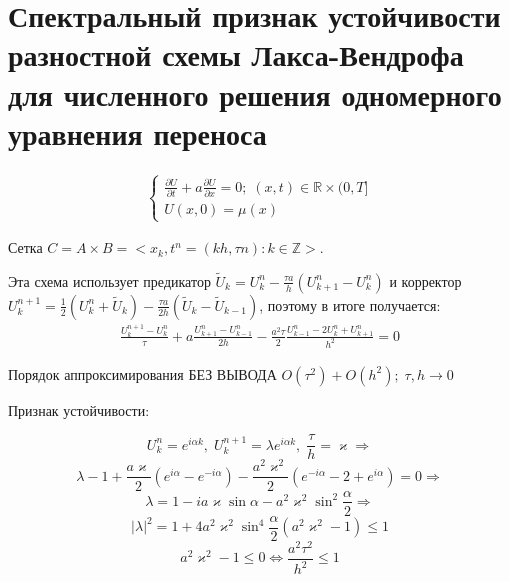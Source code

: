\documentclass[__main__.tex]{subfiles}
\begin{document}
\section{Спектральный признак устойчивости разностной схемы Лакса-Вендрофа для численного решения одномерного уравнения переноса}

\begin{gather*}
	\begin{cases}
	\frac{\partial U}{\partial t}+a\frac{\partial U}{\partial x}=0;\; (x,t)\in\mathbb{R}\times(0,T]\\
	U(x,0)=\mu(x)
	\end{cases}
\end{gather*}

Сетка $C=A\times B=<x_k,t^n=(kh,\tau n):k\in\mathbb{Z}>.$

Эта схема использует предикатор $\tilde{U}_k=U_k^n-\frac{\tau a}{h}(U_{k+1}^n-U_k^n)$ и корректор $U_k^{n+1}=\frac{1}{2}(U_k^n+\tilde{U}_k)-\frac{\tau a}{2h}(\tilde{U}_k-\tilde{U}_{k-1})$, поэтому в итоге получается:
\begin{gather*}
\frac{U_k^{n+1}-U_k^n}{\tau}+a\frac{U_{k+1}^n-U_{k-1}^n}{2h}-\frac{a^2\tau}{2}\frac{U_{k-1}^n-2U_k^n+U_{k+1}^n}{h^2}=0
\end{gather*}

Порядок аппроксимирования БЕЗ ВЫВОДА $O(\tau^2)+O(h^2);\;\tau,h\rightarrow0$

Признак устойчивости:

$$	U_k^n=e^{i\alpha k},\;U_k^{n+1}=\lambda e^{i\alpha k},\; \frac{\tau}{h}=\varkappa\Rightarrow $$
$$	\lambda-1+\frac{a\varkappa}{2}(e^{i\alpha}-e^{-i\alpha})-\frac{a^2 \varkappa^2}{2}(e^{-i\alpha}-2+e^{i\alpha})=0\Rightarrow $$
$$	\lambda=1 - i a \varkappa \sin \alpha - a^2 \varkappa^2 \sin^2 \frac{\alpha}{2}\Rightarrow $$ 
$$	|\lambda|^2 = 1 + 4a^2 \varkappa^2 \sin^4 \frac{\alpha}{2}(a^2 \varkappa^2-1)\le 1 $$
$$	a^2 \varkappa^2 - 1\le 0\Leftrightarrow \frac{a^2 \tau^2}{h^2}\le 1 $$
\end{document}
